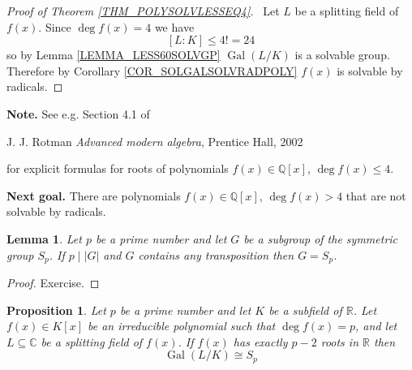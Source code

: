 \documentclass[12pt, letterpaper, oneside]{article}
\theoremstyle{plain}
\newtheorem{lemma}[theorem]{Lemma}
\newtheorem{proposition}[theorem]{Proposition}
\theoremstyle{definition}
\newcommand{\Q}{{\mathbb Q}}
\newcommand{\R}{{\mathbb R}}
\newcommand{\C}{{\mathbb C}}
\newcommand{\Gal}{\operatorname{Gal}}
\newcommand{\vs}{\vskip 5mm}
\begin{document}
\begin{proof}[Proof of Theorem \ref{THM_POLYSOLVLESSEQ4}] \ 
Let $L$ be a  splitting field of $f(x)$. Since $\deg f(x) = 4$ we have 
$$[L:K] \leq 4! = 24$$
so by Lemma \ref{LEMMA_LESS60SOLVGP} 
$\Gal(L/K)$ is a solvable group. Therefore by Corollary \ref{COR_SOLGALSOLVRADPOLY}
$f(x)$ is solvable by radicals. 

\end{proof}


\vs\vs

\textbf{Note.} See e.g. Section 4.1 of 

J. J. Rotman \emph{Advanced modern algebra}, Prentice Hall, 2002  

for explicit formulas for roots of polynomials $f(x)\in \Q[x]$, $\deg f(x) \leq 4$. 

\vs\vs

\textbf{Next goal.} There are polynomials $f(x)\in \Q[x]$,  $\deg f(x) > 4$ that are not solvable by radicals. 


\vs\vs

\begin{lemma}
\label{LEMMA_TRANSPSUBGPSN}
Let $p$ be a prime number and let $G$ be a subgroup of the symmetric group $S_{p}$. 
If $p\mid |G|$ and $G$ contains any transposition then $G=S_{p}$.
\end{lemma}

\vs 

\begin{proof}
Exercise.
\end{proof}



\vs\vs


\begin{proposition}
\label{PROP_2CPLXROOTSSP}
Let $p$ be a prime number and let $K$ be a subfield  of $\R$. Let $f(x)\in K[x]$ 
be an irreducible polynomial such that $\deg f(x) = p$, and let $L\subseteq \C$ 
be a splitting  field of $f(x)$. If $f(x)$ has exactly $p-2$ roots in $\R$ then 
$$\Gal(L/K)\cong S_{p}$$
\end{proposition}


\vs 
\end{document}
